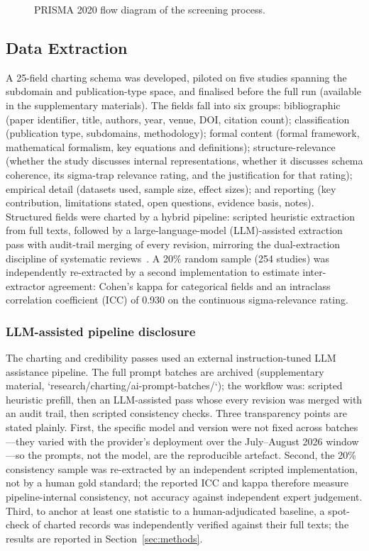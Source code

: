 \begin{figure}[htbp]
\centering

\caption{PRISMA 2020 flow diagram of the screening process.}
\label{fig:prisma-flow}
\end{figure}

\subsection{Data Extraction}
A 25-field charting schema was developed, piloted on five studies spanning the subdomain and publication-type space, and finalised before the full run (available in the supplementary materials). The fields fall into six groups: bibliographic (paper identifier, title, authors, year, venue, DOI, citation count); classification (publication type, subdomains, methodology); formal content (formal framework, mathematical formalism, key equations and definitions); structure-relevance (whether the study discusses internal representations, whether it discusses schema coherence, its sigma-trap relevance rating, and the justification for that rating); empirical detail (datasets used, sample size, effect sizes); and reporting (key contribution, limitations stated, open questions, evidence basis, notes). Structured fields were charted by a hybrid pipeline: scripted heuristic extraction from full texts, followed by a large-language-model (LLM)-assisted extraction pass with audit-trail merging of every revision, mirroring the dual-extraction discipline of systematic reviews~\cite{whiting2011quadas2}. A 20\% random sample (254 studies) was independently re-extracted by a second implementation to estimate inter-extractor agreement: Cohen's kappa for categorical fields and an intraclass correlation coefficient (ICC) of 0.930 on the continuous sigma-relevance rating.

\subsubsection{LLM-assisted pipeline disclosure}
The charting and credibility passes used an external instruction-tuned LLM assistance pipeline. The full prompt batches are archived (supplementary material, `research/charting/ai-prompt-batches/`); the workflow was: scripted heuristic prefill, then an LLM-assisted pass whose every revision was merged with an audit trail, then scripted consistency checks. Three transparency points are stated plainly. First, the specific model and version were not fixed across batches---they varied with the provider's deployment over the July--August 2026 window---so the prompts, not the model, are the reproducible artefact. Second, the 20\% consistency sample was re-extracted by an independent scripted implementation, not by a human gold standard; the reported ICC and kappa therefore measure pipeline-internal consistency, not accuracy against independent expert judgement. Third, to anchor at least one statistic to a human-adjudicated baseline, a spot-check of charted records was independently verified against their full texts; the results are reported in Section~\ref{sec:methods}.

